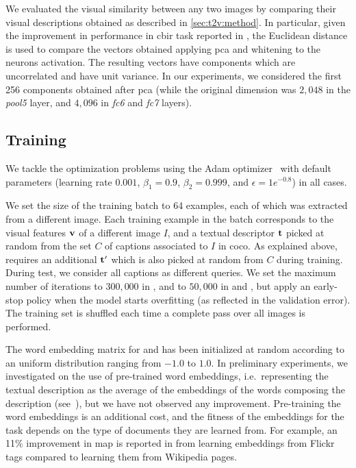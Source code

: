 We evaluated the visual similarity between any two images by comparing their visual descriptions obtained as described in \ref{sec:t2v:method}.
In particular, given the improvement in performance in \gls{cbir} task reported in \cite{sharif2014cnn,gong2014multi,gordo2016deep}, the Euclidean distance is used to compare the vectors obtained applying \gls{pca} and whitening \cite{comon1994independent} to the neurons activation.
The resulting vectors have components which are uncorrelated and have unit variance.
In our experiments, we considered the first 256 components obtained after \gls{pca} (while the original dimension was $2,048$ in the \emph{pool5} layer, and $4,096$ in \emph{fc6} and \emph{fc7} layers).


\subsection{Training}

We tackle the optimization problems using the Adam optimizer~\cite{kingma2014adam} with default parameters (learning rate $0.001$, $\beta_1=0.9$, $\beta_2=0.999$, and $\epsilon=1e^{-0.8}$) in all cases.

We set the size of the training batch to 64 examples, each of which was extracted from a different image.
Each training example in the batch corresponds to the visual features $\mathbf{v}$ of a different image $I$, and a textual descriptor $\mathbf{t}$ picked at random from the set $C$ of captions associated to $I$ in \gls{coco}.
As explained above, \sparsettv{} requires an additional $\mathbf{t}'$ which is also picked at random from $C$ during training.
During test, we consider all captions as different queries.
We set the maximum number of iterations to $300,000$ in \sparsettv{}, and to $50,000$ in \densettv{} and \widedeepttv{}, but apply an early-stop policy when the model starts overfitting (as reflected in the validation error).
The training set is shuffled each time a complete pass over all images is performed.

The word embedding matrix for \densettv{} and \widedeepttv{} has been initialized at random according to an uniform distribution ranging from $-1.0$ to $1.0$.
In preliminary experiments, we investigated on the use of pre-trained word embeddings, i.e.\ representing the textual description as the average of the embeddings of the words composing the description (see~\cite{dong2018predicting}), but we have not observed any improvement.
Pre-training the word embeddings is an additional cost, and the fitness of the embeddings for the task depends on the type of documents they are learned from.
For example, an 11\% improvement in \gls{map} is reported in \cite{cappallo2015image2emoji} from learning embeddings from Flickr tags compared to learning them from Wikipedia pages.

